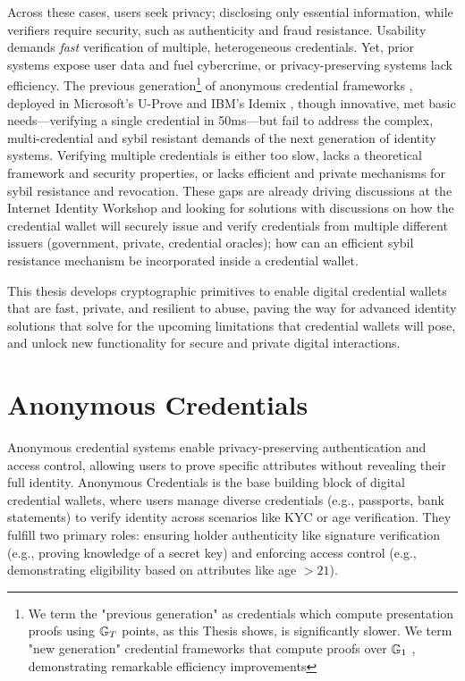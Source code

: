 Across these cases, users seek privacy; disclosing only essential information, while verifiers require security, such as authenticity and fraud resistance. Usability demands \emph{fast} verification of multiple, heterogeneous credentials. Yet, prior systems expose user data and fuel cybercrime, or privacy-preserving systems lack efficiency. The previous generation\footnote{We term the "previous generation" as credentials which compute presentation proofs using $\mathbb{G}_T$ points, as this Thesis shows, is significantly slower. We term "new generation" credential frameworks that compute proofs over $\mathbb{G}_1$  \cite{camenisch_anonymous_2016, tessaro_revisiting_2023, tomescu_utt_2022}, demonstrating remarkable efficiency improvements} of anonymous credential frameworks \cite{hutchison_signature_2004, hutchison_constant-size_2006, sako_short_2016}, deployed in Microsoft's U-Prove and IBM's Idemix \cite{camenisch_design_2002, dunkelman_formal_2016}, though innovative, met basic needs—verifying a single credential in 50ms—but fail to address the complex, multi-credential and sybil resistant demands of the next generation of identity systems. Verifying multiple credentials is either too slow, lacks a theoretical framework and security properties, or lacks efficient and private mechanisms for sybil resistance and revocation. These gaps are already driving discussions at the Internet Identity Workshop \cite{internet_identity_workshop_internet_2025} and looking for solutions with discussions on how the credential wallet will securely issue and verify credentials from multiple different issuers (government, private, credential oracles); how can an efficient sybil resistance mechanism be incorporated inside a credential wallet.

This thesis develops cryptographic primitives to enable digital credential wallets that are fast, private, and resilient to abuse, paving the way for advanced identity solutions that solve for the upcoming limitations that credential wallets will pose, and unlock new functionality for secure and private digital interactions.


\section{Anonymous Credentials}
Anonymous credential systems enable privacy-preserving authentication and access control, allowing users to prove specific attributes without revealing their full identity. Anonymous Credentials is the base building block of digital credential wallets, where users manage diverse credentials (e.g., passports, bank statements) to verify identity across scenarios like KYC or age verification. They fulfill two primary roles: ensuring holder authenticity like signature verification (e.g., proving knowledge of a secret key) and enforcing access control (e.g., demonstrating eligibility based on attributes like age $ > 21 $).

